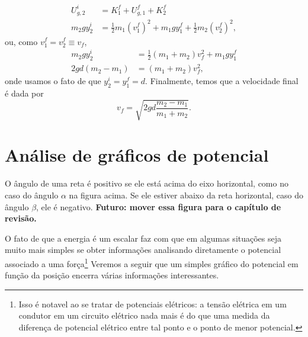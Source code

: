 %
\begin{align}
    U_{g, 2}^i &= K_1^f + U_{g, 1}^f + K_2^f \\
    m_2gy_2^i &= \frac{1}{2} m_1 (v_1^f)^2 + m_1gy_1^f + \frac{1}{2} m_2 (v_2^f)^2,
\end{align}
%
ou, como $v_1^f = v_2^f \equiv v_f$,
\begin{align}
    m_2gy_2^i &= \frac{1}{2} (m_1 + m_2) v_f^2 + m_1gy_1^f \\
    2gd(m_2-m_1) &= (m_1+m_2) v_f^2,
\end{align}
%
onde usamos o fato de que $y_2^i = y_1^f = d$. Finalmente, temos que a velocidade final é dada por
\begin{equation}
    v_f = \sqrt{2gd\frac{m_2-m_1}{m_1+m_2}}.
\end{equation}

\section{Análise de gráficos de potencial}

\begin{marginfigure}[-3cm]
\caption{O ângulo de uma reta é positivo se ele está acima do eixo horizontal, como no caso do ângulo $\alpha$ na figura acima. Se ele estiver abaixo da reta horizontal, caso do ângulo $\beta$, ele é negativo. \textbf{Futuro: mover essa figura para o capítulo de revisão.} \label{Fig:SinalInclinacao}}
\end{marginfigure}

O fato de que a energia é um escalar faz com que em algumas situações seja muito mais simples se obter informações analisando diretamente o potencial associado a uma força\footnote{Isso é notavel ao se tratar de potenciais elétricos: a tensão elétrica em um condutor em um circuito elétrico nada mais é do que uma medida da diferença de potencial elétrico entre tal ponto e o ponto de menor potencial.} Veremos a seguir que um simples gráfico do potencial em função da posição encerra várias informações interessantes.

